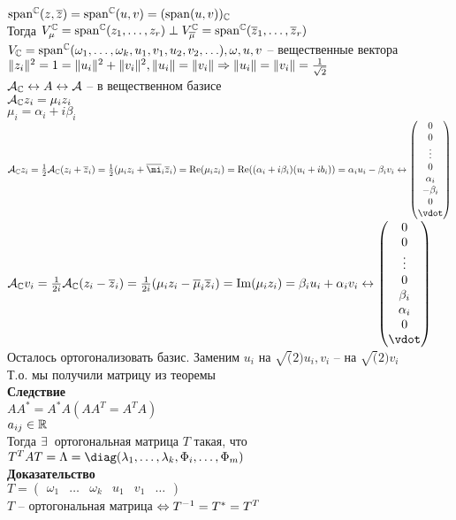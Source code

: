 \documentclass[12pt]{article}
\begin{document}
$\operatorname{span}^\mathbb{C}(z, \overline z) = \operatorname{span}^\mathbb{C}(u, v) = (\operatorname{span}(u,v))_\mathbb{C}$\\
Тогда $V_\mu^\mathbb{C} = \operatorname{span}^\mathbb{C}(z_1, \ldots, z_r) \perp V_{\overline \mu}^\mathbb{C} = \operatorname{span}^\mathbb{C}(\overline z_1, \ldots, \overline z_r)$\\
$V_\mathbb{C} = \operatorname{span}^\mathbb{C}(\omega_1, \ldots, \omega_k, u_1, v_1, u_2, v_2, \ldots), \omega, u, v$ -- вещественные вектора\\
$\|z_i\|^2 = 1 = \|u_i\|^2 + \|v_i\|^2, \|u_i\|=\|v_i\| \Rightarrow \|u_i\|=\|v_i\| = \frac1{\sqrt{2}}$\\
$\mathcal{A}_\mathbb{C} \leftrightarrow A \leftrightarrow \mathcal{A}$ -- в вещественном базисе\\
$\mathcal{A}_\mathbb{C} z_i = \mu_i z_i$\\
$\mu_i = \alpha_i + i \beta_i$\\
$\mcA_\Cset z_i = \frac12 \mcA_{\Cset}(z_i + \ol z_i) = \frac12(\mu_i z_i + \ol \mi_i \ol z_i) = \re(\mu_i z_i) = \re(( \alpha_i + i \beta_i)(u_i + i b_i)) = \alpha_i u_i - \beta_i v_i \lrto \begin{pmatrix}0\\0\\\vdots\\0\\ \alpha_i \\ - \beta_i\\0\\\vdot\end{pmatrix}$\\
$\mcA_\Cset v_i = \frac1{2i} \mcA_\Cset(z_i - \ol z_i) = \frac1{2i}(\mu_iz_i - \ol \mu_i \ol z_i) = \im (\mu_i z_i) = \beta_i u_i + \alpha_i v_i \lrto \begin{pmatrix}0\\0\\\vdots\\0\\\beta_i\\\alpha_i\\0\\\vdot\end{pmatrix}$\\
Осталось ортогонализовать базис. Заменим $u_i$ на $\sqrt(2)u_i, v_i$ -- на $\sqrt(2)v_i$\\
Т.о. мы получили матрицу из теоремы\\
\textbf{Следствие}\\
$AA^* = A^*A(AA^T = A^TA)$\\
$a_{ij} \in \mathbb{R}$\\
Тогда $\exists\,$ ортогональная матрица $T$ такая, что $T^T AT = \Lambda = \diag( \lambda_1, \ldots, \lambda_k, \Phi_i, \ldots, \Phi_m)$\\
\textbf{Доказательство}\\
$T = \begin{pmatrix}\omega_1 & \ldots & \omega_k & u_1 & v_1 & \ldots\end{pmatrix}$\\
$T$ -- ортогональная матрица $\Leftrightarrow T^{-1} = T^* = T^T$
\end{document}

